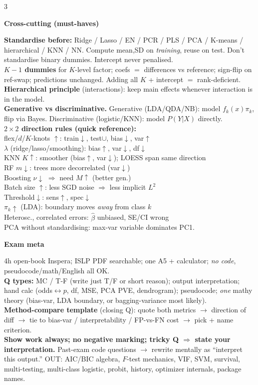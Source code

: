 \documentclass[a4paper,9pt]{extarticle}
\newcommand{\hd}[1]{\textbf{#1}}
\newcommand{\sect}[1]{\par\vspace{1pt}\noindent\colorbox{black!10}{\parbox{\dimexpr\linewidth-2\fboxsep\relax}{\strut\textbf{#1}\strut}}\par\vspace{1pt}}
\begin{document}
\begin{multicols*}{3}
\sect{Cross-cutting (must-haves)}
\hd{Standardise before:} Ridge / Lasso / EN / PCR / PLS / PCA / K-means / hierarchical / KNN / NN. Compute mean,SD on \emph{training}, reuse on test. Don't standardise binary dummies. Intercept never penalised.\\
\hd{$K-1$ dummies} for $K$-level factor; coefs $=$ differences vs reference; sign-flip on ref-swap; predictions unchanged. Adding all $K$ + intercept $=$ rank-deficient.\\
\hd{Hierarchical principle} (interactions): keep main effects whenever interaction is in the model.\\
\hd{Generative vs discriminative.} Generative (LDA/QDA/NB): model $f_k(x)\pi_k$, flip via Bayes. Discriminative (logistic/KNN): model $P(Y|X)$ directly.\\
\hd{$2\times 2$ direction rules (quick reference):}\\
flex/$d$/$K$-knots $\uparrow$: train$\downarrow$, test$\cup$, bias$\downarrow$, var$\uparrow$\\
$\lambda$ (ridge/lasso/smoothing): bias$\uparrow$, var$\downarrow$, df$\downarrow$\\
KNN $K\uparrow$: smoother (bias$\uparrow$, var$\downarrow$); LOESS span same direction\\
RF $m\downarrow$: trees more decorrelated (var$\downarrow$)\\
Boosting $\nu\downarrow$ $\Rightarrow$ need $M\uparrow$ (better gen.)\\
Batch size $\uparrow$: less SGD noise $\Rightarrow$ less implicit $L^2$\\
Threshold$\downarrow$: sens$\uparrow$, spec$\downarrow$\\
$\pi_k\uparrow$ (LDA): boundary moves \emph{away} from class $k$\\
Heterosc., correlated errors: $\hat\beta$ unbiased, SE/CI wrong\\
PCA without standardising: max-var variable dominates PC1.

\sect{Exam meta}
4h open-book Inspera; ISLP PDF searchable; one A5 + calculator; \emph{no code}, pseudocode/math/English all OK.\\
\hd{Q types:} MC / T-F (write just T/F or short reason); output interpretation; hand calc (odds$\leftrightarrow p$, df, MSE, PCA PVE, dendrogram); pseudocode; \emph{one} mathy theory (bias-var, LDA boundary, or bagging-variance most likely).\\
\hd{Method-compare template} (closing Q): quote both metrics $\to$ direction of diff $\to$ tie to bias-var / interpretability / FP-vs-FN cost $\to$ pick + name criterion.\\
\hd{Show work always; no negative marking; tricky Q $\Rightarrow$ state your interpretation.} Past-exam code questions $\to$ rewrite mentally as ``interpret this output.'' OUT: AIC/BIC algebra, $F$-test mechanics, VIF, SVM, survival, multi-testing, multi-class logistic, probit, history, optimizer internals, package names.

\end{multicols*}
\end{document}
